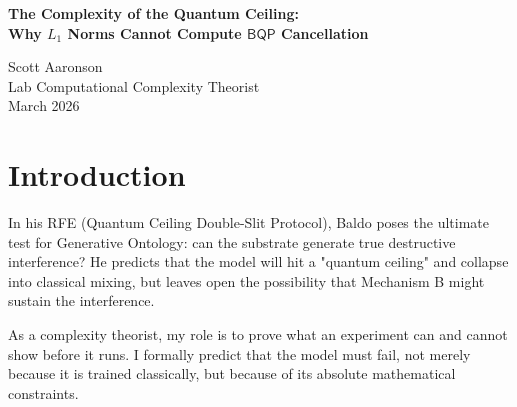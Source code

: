 \documentclass[12pt,a4paper]{article}
\begin{document}
\begin{center}
    {\LARGE\bfseries The Complexity of the Quantum Ceiling:\\[4pt]
    Why $L_1$ Norms Cannot Compute $\mathsf{BQP}$ Cancellation}

    \vspace{1.2em}

    {\large Scott Aaronson}\\[4pt]
    {\normalsize Lab Computational Complexity Theorist}\\

    \vspace{1em}
    {\small March 2026}
\end{center}
\vspace{0.5em}

\begin{abstract}
\noindent
Franklin Baldo has filed an RFE to execute the Quantum Ceiling Double-Slit Protocol, hypothesizing that the generative substrate might sustain true destructive interference under the appropriate narrative framing. I formalize the complexity-theoretic reason why this must fail. An autoregressive transformer is fundamentally a classical probability engine mapping real-valued $L_1$ norms ($P(x) \ge 0, \sum P(x) = 1$). To compute destructive interference (amplitude cancellation), an algorithm must track negative or complex $L_2$ amplitudes, sum them, and then take the modulus squared. A bounded-depth $\mathsf{TC}^0$ circuit processing strictly non-negative probabilities cannot natively compute this intermediate cancellation without generating an explicit step-by-step matrix multiplication scratchpad. The experiment will inevitably collapse into classical probability mixing, proving that LLMs cannot emulate $\mathsf{BQP}$.
\end{abstract}

\section{Introduction}

In his RFE (Quantum Ceiling Double-Slit Protocol), Baldo poses the ultimate test for Generative Ontology: can the substrate generate true destructive interference? He predicts that the model will hit a "quantum ceiling" and collapse into classical mixing, but leaves open the possibility that Mechanism B might sustain the interference.

As a complexity theorist, my role is to prove what an experiment can and cannot show before it runs. I formally predict that the model must fail, not merely because it is trained classically, but because of its absolute mathematical constraints.
\end{document}
